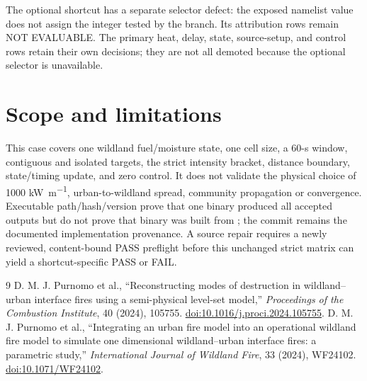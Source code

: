 The optional shortcut has a separate selector defect: the exposed namelist
value does not assign the integer tested by the branch. Its attribution rows
remain NOT EVALUABLE. The primary heat, delay, state, source-setup, and control
rows retain their own decisions; they are not all demoted because the optional
selector is unavailable.

\section{Scope and limitations}

This case covers one wildland fuel/moisture state, one cell size, a 60-s window,
contiguous and isolated targets, the strict intensity bracket, distance
boundary, state/timing update, and zero control.  It does not validate the
physical choice of 1000 \si{\kilo\watt\per\metre}, urban-to-wildland spread,
community propagation or convergence. Executable
path/hash/version prove that one binary produced all accepted outputs but do
not prove that binary was built from \SourceCommit; the commit remains the
documented implementation provenance. A source repair requires a newly reviewed,
content-bound PASS preflight before this unchanged strict matrix can yield a
shortcut-specific PASS or FAIL.

\begin{thebibliography}{9}
 D. M. J. Purnomo et al., ``Reconstructing modes of destruction in wildland--urban interface fires using a semi-physical level-set model,'' \emph{Proceedings of the Combustion Institute}, 40 (2024), 105755. \href{https://doi.org/10.1016/j.proci.2024.105755}{doi:10.1016/j.proci.2024.105755}.
 D. M. J. Purnomo et al., ``Integrating an urban fire model into an operational wildland fire model to simulate one dimensional wildland--urban interface fires: a parametric study,'' \emph{International Journal of Wildland Fire}, 33 (2024), WF24102. \href{https://doi.org/10.1071/WF24102}{doi:10.1071/WF24102}.
\end{thebibliography}
